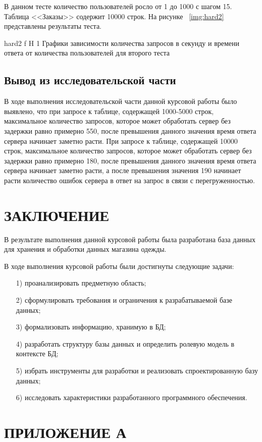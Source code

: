 \documentclass{bmstu}
\begin{document}
В данном тесте количество пользователей росло от 1 до 1000 с шагом 15. Таблица <<Заказы>> содержит 10000 строк. На рисунке ~\ref{img:hard2} представлены результаты теста.

{hard2}
{f}
{H}
{1\textwidth}
{Графики зависимости количества запросов в секунду и времени ответа от количества пользователей для второго теста}

\section*{Вывод из исследовательской части}

В ходе выполнения исследовательской части данной курсовой работы было выявлено, что при запросе к таблице, содержащей 1000-5000 строк, максимальное количество запросов, которое может обработать сервер без задержки равно примерно 550, после превышения данного значения время ответа сервера начинает заметно расти. При запросе к таблице, содержащей 10000 строк, максимальное количество запросов, которое может обработать сервер без задержки равно примерно 180, после превышения данного значения время ответа сервера начинает заметно расти, а после превышения значения 190 начинает расти количество ошибок сервера в ответ на запрос в связи с перегруженностью.

{\centering \chapter*{ЗАКЛЮЧЕНИЕ}}

В результате выполнения данной курсовой работы была разработана база данных для хранения и обработки данных магазина одежды.

В ходе выполнения курсовой работы были достигнуты следующие задачи:
\begin{enumerate}
	\item[1)] проанализировать предметную область;
	\item[2)] сформулировать требования и ограничения к разрабатываемой базе данных;
	\item[3)] формализовать информацию, хранимую в БД;
	\item[4)] разработать структуру базы данных и определить ролевую модель в контексте БД;
	\item[5)] избрать инструменты для разработки и реализовать спроектированную базу данных;
	\item[6)] исследовать характеристики разработанного программного обеспечения.
\end{enumerate}

{\centering \printbibliography[title=СПИСОК ИСПОЛЬЗОВАННЫХ ИСТОЧНИКОВ,heading=bibintoc]}

{\centering \chapter*{ПРИЛОЖЕНИЕ А}}
\end{document}
